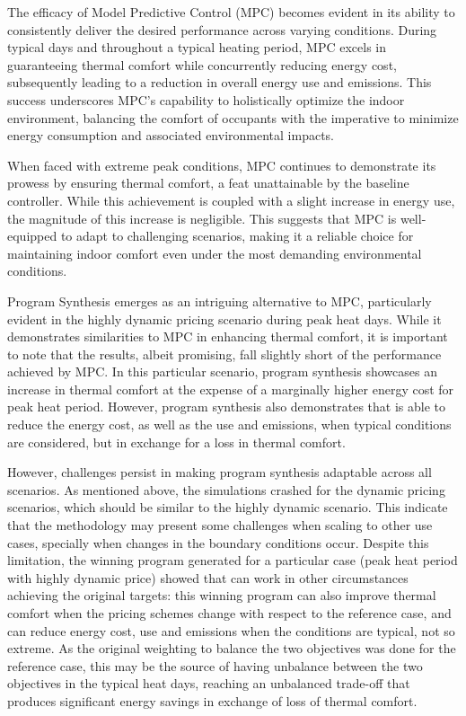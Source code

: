 The efficacy of Model Predictive Control (MPC) becomes evident in its ability to consistently deliver the desired performance across varying conditions. During typical days and throughout a typical heating period, MPC excels in guaranteeing thermal comfort while concurrently reducing energy cost, subsequently leading to a reduction in overall energy use and emissions. This success underscores MPC's capability to holistically optimize the indoor environment, balancing the comfort of occupants with the imperative to minimize energy consumption and associated environmental impacts.

When faced with extreme peak conditions, MPC continues to demonstrate its prowess by ensuring thermal comfort, a feat unattainable by the baseline controller. While this achievement is coupled with a slight increase in energy use, the magnitude of this increase is negligible. This suggests that MPC is well-equipped to adapt to challenging scenarios, making it a reliable choice for maintaining indoor comfort even under the most demanding environmental conditions.

Program Synthesis emerges as an intriguing alternative to MPC, particularly evident in the highly dynamic pricing scenario during peak heat days. While it demonstrates similarities to MPC in enhancing thermal comfort, it is important to note that the results, albeit promising, fall slightly short of the performance achieved by MPC. In this particular scenario, program synthesis showcases an increase in thermal comfort at the expense of a marginally higher energy cost for peak heat period. However, program synthesis also demonstrates that is able to reduce the energy cost, as well as the use and emissions, when typical conditions are considered, but in exchange for a loss in thermal comfort. 

However, challenges persist in making program synthesis adaptable across all scenarios. As mentioned above, the simulations crashed for the dynamic pricing scenarios, which should be similar to the highly dynamic scenario. This indicate that the methodology may present some challenges when scaling to other use cases, specially when changes in the boundary conditions occur. Despite this limitation, the winning program generated for a particular case (peak heat period with highly dynamic price) showed that can work in other circumstances achieving the original targets: this winning program can also improve thermal comfort when the pricing schemes change with respect to the reference case, and can reduce energy cost, use and emissions when the conditions are typical, not so extreme. As the original weighting to balance the two objectives was done for the reference case, this may be the source of having unbalance between the two objectives in the typical heat days, reaching an unbalanced trade-off that produces significant energy savings in exchange of loss of thermal comfort.

